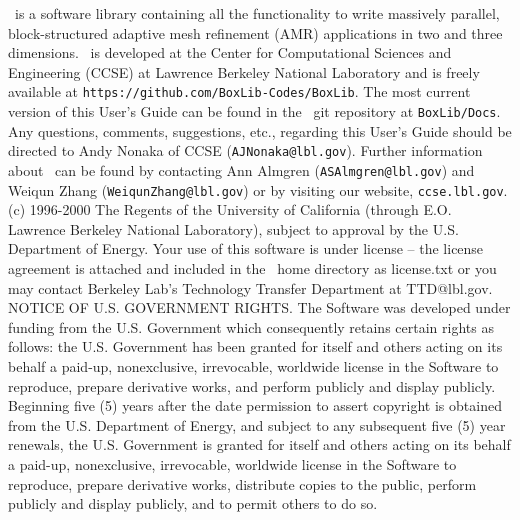 \noindent \BoxLib\ is a software library containing all the functionality 
to write massively parallel, 
block-structured adaptive mesh refinement (AMR) applications in two and three dimensions.
\BoxLib\ is developed at the Center for Computational Sciences and Engineering (CCSE) at 
Lawrence Berkeley National Laboratory and is freely available
at {\tt https://github.com/BoxLib-Codes/BoxLib}.
The most current version of this User's Guide
can be found in the \BoxLib\ git repository at {\tt BoxLib/Docs}.  Any questions,
comments, suggestions, etc., regarding this User's Guide should be directed
to Andy Nonaka of CCSE ({\tt AJNonaka@lbl.gov}).  Further information 
about \BoxLib\ can be found by contacting Ann Almgren
({\tt ASAlmgren@lbl.gov}) and Weiqun Zhang ({\tt WeiqunZhang@lbl.gov})
or by visiting our website, {\tt ccse.lbl.gov}.\\

\noindent (c) 1996-2000 The Regents of the University of California (through
E.O. Lawrence Berkeley National Laboratory), subject to approval by
the U.S. Department of Energy.  Your use of this software is under
license -- the license agreement is attached and included in the
\BoxLib\ home directory as license.txt or you may contact Berkeley Lab's Technology
Transfer Department at TTD@lbl.gov.  NOTICE OF U.S. GOVERNMENT RIGHTS.
The Software was developed under funding from the U.S. Government
which consequently retains certain rights as follows: the
U.S. Government has been granted for itself and others acting on its
behalf a paid-up, nonexclusive, irrevocable, worldwide license in the
Software to reproduce, prepare derivative works, and perform publicly
and display publicly.  Beginning five (5) years after the date
permission to assert copyright is obtained from the U.S. Department of
Energy, and subject to any subsequent five (5) year renewals, the
U.S. Government is granted for itself and others acting on its behalf
a paid-up, nonexclusive, irrevocable, worldwide license in the
Software to reproduce, prepare derivative works, distribute copies to
the public, perform publicly and display publicly, and to permit
others to do so.\\

